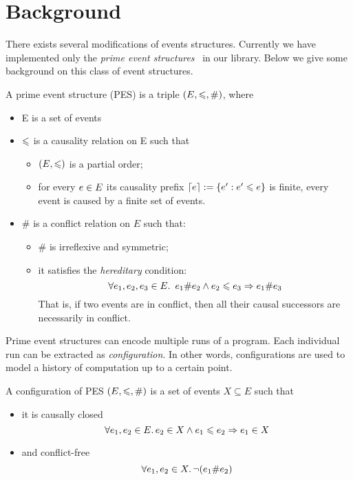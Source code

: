\section{Background}

There exists several modifications of events structures.
Currently we have implemented only 
the \emph{prime event structures}~\cite{Winskel:86} in our library. 
Below we give some background on this class of event structures. 

\begin{definition} 
\label{es_def}
A prime event structure (PES) is a triple $(E, \leqslant, \#)$, where
\begin{itemize}
  \item E is a set of events
  \item $\leqslant$ is a causality relation on E such that 
  \begin{itemize}
    \item $ (E, \leqslant) $ is a partial order;
    \item for every $e \in E$ its causality prefix ${\lceil e \rceil := \{ e' : e' \leqslant e \}}$ 
      is finite, \ie every event is caused by a finite set of events.
  \end{itemize}
  \item $\#$ is a conflict relation on $E$ such that:
  \begin{itemize}
    \item $\#$ is irreflexive and symmetric;
    \item it satisfies the \emph{hereditary} condition:
    $$ \forall e_1, e_2, e_3 \in E \ldotp \ e_1 \# e_2 \land e_2 \leqslant e_3 \Rightarrow e_1 \# e_3 $$
      That is, if two events are in conflict, then all their causal successors 
      are necessarily in conflict.
  \end{itemize}
\end{itemize}
\end{definition}

Prime event structures can encode multiple runs of a program.
Each individual run can be extracted as \emph{configuration}. 
In other words, configurations are used to model 
a history of computation up to a certain point.

\begin{definition}
A configuration of PES $(E, \leqslant, \#)$ is a set of events $X \subseteq E$ such that
\begin{itemize}
  \item it is causally closed 
    $$ \forall e_1, e_2 \in E \ldotp e_2 \in X \land e_1 \leqslant e_2 \Rightarrow e_1 \in X $$
  \item and conflict-free 
    $$ \forall e_1, e_2 \in X \ldotp \neg (e_1 \# e_2) $$
\end{itemize}
\end{definition}

